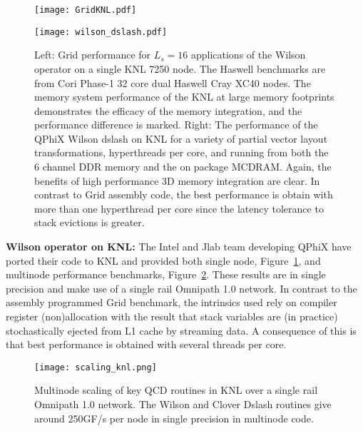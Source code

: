 \documentclass{PoS}
\begin{document}
\begin{figure}[hbt]
\begin{minipage}{0.5\textwidth}
\texttt{[image: GridKNL.pdf]}
\vspace{-0.05\textheight}
\end{minipage}
\begin{minipage}{0.5\textwidth}
\texttt{[image: wilson\_dslash.pdf]}
\end{minipage}
\caption{
\label{fig:GridKNL} \label{fig:qphix1}
Left: Grid performance for $L_s=16$ applications of the Wilson operator on a single KNL 7250 node. The Haswell benchmarks
are from Cori Phase-1 32 core dual Haswell Cray XC40 nodes. The memory system performance of the KNL at large memory footprints 
demonstrates the efficacy of the memory integration, and the performance difference is marked. 
Right: The performance of the QPhiX Wilson dslash on KNL for a variety of partial vector layout transformations, hyperthreads per core, 
and running from both the 6 channel DDR memory and the on package MCDRAM. Again, the benefits of high performance 3D memory integration are
clear. In contrast to Grid assembly code, the best performance is obtain with more than one hyperthread per core since the latency tolerance
to stack evictions is greater.
}
\end{figure}

{\bf Wilson operator on KNL:}
The Intel and Jlab team developing QPhiX\cite{qphix} have ported their code to KNL and
provided both single node, Figure~\ref{fig:qphix1}, and multinode performance benchmarks, Figure~\ref{fig:qphix2}.
These results are in single precision and make use of a single rail Omnipath 1.0 network.
In contrast to the assembly programmed Grid benchmark, the intrinsics used rely on compiler 
register (non)allocation with the result that stack variables are (in practice) stochastically ejected from L1 cache by
streaming data. A consequence of this is that best performance is obtained with several threads per core.

\begin{figure}[hbt]
\texttt{[image: scaling\_knl.png]}
\caption{\label{fig:qphix2} Multinode scaling of key QCD routines in KNL over a single rail Omnipath 1.0 network.
The Wilson and Clover Dslash routines give around 250GF/s per node in single precision in multinode code.}
\end{figure}
\end{document}
